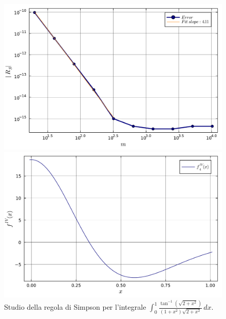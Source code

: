 \documentclass[letterpaper, 12pt]{article}
\numberwithin{equation}{section}    %
\begin{document}
\begin{figure}[!ht]
    \centering
    \begin{minipage}[b]{0.47\textwidth}
        \includegraphics[width=\textwidth]{5144.pdf}
    \end{minipage}
    \hspace{0.5cm}
    \begin{minipage}[b]{0.47\textwidth}
        \includegraphics[width=\textwidth]{5144_2.pdf}
    \end{minipage}
    \caption{Studio della regola di Simpson per l'integrale $\int_0^1 \frac{\tan^{-1}(\sqrt{2+x^2})}{(1+x^2)\sqrt{2+x^2}}\,dx$.}
    \label{fig:es5_1_4_4}
\end{figure}
\end{document}
